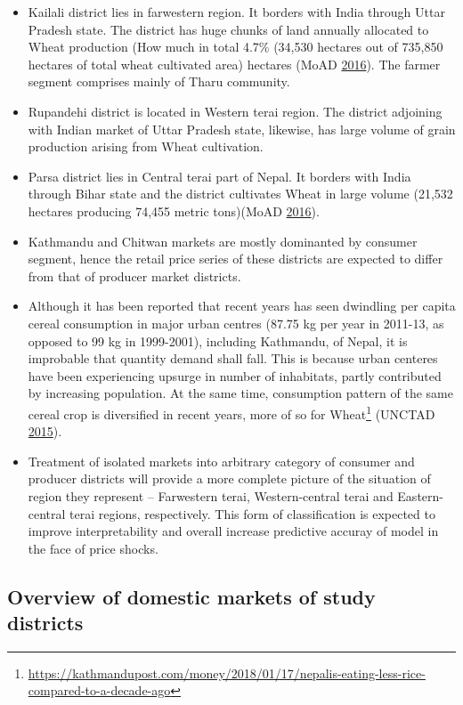 \documentclass[12pt,]{article}
\providecommand{\tightlist}{%
  \setlength{\itemsep}{0pt}\setlength{\parskip}{0pt}}
\begin{document}
\begin{itemize}
\tightlist
\item
  Kailali district lies in farwestern region. It borders with India through Uttar Pradesh state. The district has huge chunks of land annually allocated to Wheat production (How much in total 4.7\% (34,530 hectares out of 735,850 hectares of total wheat cultivated area) hectares (MoAD \protect\hyperlink{ref-moad2016statistical}{2016}). The farmer segment comprises mainly of Tharu community.
\item
  Rupandehi district is located in Western terai region. The district adjoining with Indian market of Uttar Pradesh state, likewise, has large volume of grain production arising from Wheat cultivation.
\item
  Parsa district lies in Central terai part of Nepal. It borders with India through Bihar state and the district cultivates Wheat in large volume (21,532 hectares producing 74,455 metric tons)(MoAD \protect\hyperlink{ref-moad2016statistical}{2016}).
\item
  Kathmandu and Chitwan markets are mostly dominanted by consumer segment, hence the retail price series of these districts are expected to differ from that of producer market districts.
\item
  Although it has been reported that recent years has seen dwindling per capita cereal consumption in major urban centres (87.75 kg per year in 2011-13, as opposed to 99 kg in 1999-2001), including Kathmandu, of Nepal, it is improbable that quantity demand shall fall. This is because urban centeres have been experiencing upsurge in number of inhabitats, partly contributed by increasing population. At the same time, consumption pattern of the same cereal crop is diversified in recent years, more of so for Wheat\footnote{\url{https://kathmandupost.com/money/2018/01/17/nepalis-eating-less-rice-compared-to-a-decade-ago}} (UNCTAD \protect\hyperlink{ref-unctad2015foodsecurity}{2015}).
\item
  Treatment of isolated markets into arbitrary category of consumer and producer districts will provide a more complete picture of the situation of region they represent -- Farwestern terai, Western-central terai and Eastern-central terai regions, respectively. This form of classification is expected to improve interpretability and overall increase predictive accuray of model in the face of price shocks.
\end{itemize}

\hypertarget{overview-of-domestic-markets-of-study-districts}{%
\subsection{Overview of domestic markets of study districts}\label{overview-of-domestic-markets-of-study-districts}}
\end{document}
